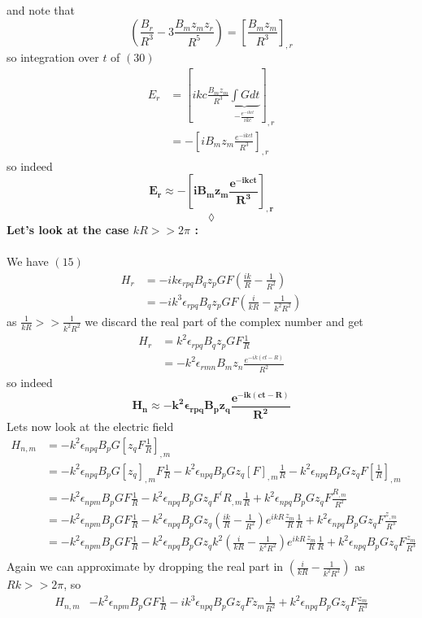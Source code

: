 and note that $$\left(\frac{B_r}{R^3} -3\frac{B_mz_mz_r}{R^5}\right)=\left[\frac{B_mz_m}{R^3}\right]_{,r}$$
so integration over $t$ of $(30)$
\begin{align}
E_r &= \left[ikc\frac{B_mz_m}{R^3}\underbrace{\int Gdt}_{-\frac{e^{-ikct}}{ikc}}\right]_{,r}\\
&= -\left[iB_mz_m\frac{e^{-ikct}}{R^3}\right]_{,r}
\end{align}
so indeed 
$$\mathbf{E_r\approx-\left[iB_mz_m\frac{e^{-ikct}}{R^3}\right]_{,r}}$$
$$\lozenge$$
\textbf{Let's look at the case $kR >> 2\pi$ :}\\\\
We have $(15)$
\begin{align}
H_r&=  -ik\epsilon_{rpq}B_qz_pGF\left(\frac{ik}{R}-\frac{1}{R^2}\right)\\
&=  -ik^3\epsilon_{rpq}B_qz_pGF\left(\frac{i}{kR}-\frac{1}{k^2R^2}\right)
\end{align}
as $ \frac{1}{kR}>>\frac{1}{k^2R^2}$ we discard the real part of the complex number and get 
\begin{align}
H_r&=  k^2\epsilon_{rpq}B_qz_pGF\frac{1}{R}\\
&= -k^2\epsilon_{rmn}B_mz_n\frac{e^{-ik(ct-R)}}{R^2}
\end{align}
so indeed $$\mathbf{H_n\approx -k^2\epsilon_{rpq}B_pz_q\frac{e^{-ik(ct-R)}}{R^2}}$$
Lets now look at the electric field
\begin{align}
H_{n,m}&= -k^2\epsilon_{npq}B_pG\left[z_qF\frac{1}{R}\right]_{,m}\\
&= -k^2\epsilon_{npq}B_pG\left[z_q\right]_{,m}F\frac{1}{R}-k^2\epsilon_{npq}B_pGz_q\left[F\right]_{,m}\frac{1}{R}-k^2\epsilon_{npq}B_pGz_qF\left[\frac{1}{R}\right]_{,m}\\
&= -k^2\epsilon_{npm}B_pGF\frac{1}{R}-k^2\epsilon_{npq}B_pGz_qF^{'}R_{,m}\frac{1}{R}+k^2\epsilon_{npq}B_pGz_qF\frac{R_{,m}}{R^2}\\
&= -k^2\epsilon_{npm}B_pGF\frac{1}{R}-k^2\epsilon_{npq}B_pGz_q\left(\frac{ik}{R}-\frac{1}{R^2}\right)e^{ikR}\frac{z_m}{R}\frac{1}{R}+k^2\epsilon_{npq}B_pGz_qF\frac{z_{,m}}{R^3}\\
&= -k^2\epsilon_{npm}B_pGF\frac{1}{R}-k^2\epsilon_{npq}B_pGz_qk^2\left(\frac{i}{kR}-\frac{1}{k^2R^2}\right)e^{ikR}\frac{z_m}{R}\frac{1}{R}+k^2\epsilon_{npq}B_pGz_qF\frac{z_{m}}{R^3}\\
\end{align}
Again we can approximate by dropping the real part in $\left(\frac{i}{kR}-\frac{1}{k^2R^2}\right)$ as $Rk>> 2\pi$, so
\begin{align}
H_{n,m}&-k^2\epsilon_{npm}B_pGF\frac{1}{R}-ik^3\epsilon_{npq}B_pGz_qFz_m\frac{1}{R^2}+k^2\epsilon_{npq}B_pGz_qF\frac{z_{m}}{R^3}
\end{align}

